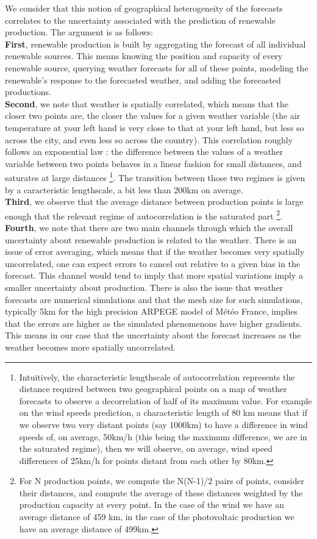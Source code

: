 We consider that this notion of geographical heterogeneity of the forecasts correlates to the uncertainty associated with the prediction of renewable production. The argument is as follows: \\
\textbf{First}, renewable production is built by aggregating the forecast of all individual renewable sources. This means knowing the position and capacity of every renewable source, querying weather forecasts for all of these points, modeling the renewable's response to the forecasted weather, and adding the forecasted productions. \\
\textbf{Second}, we note that weather is spatially correlated, which means that the closer two points are, the closer the values for a given weather variable (the air temperature at your left hand is very close to that at your left hand, but less so across the city, and even less so across the country). This correlation roughly follows an exponential law : the difference between the values of a weather variable between two points behaves in a linear fashion for small distances, and saturates at large distances \footnote{Intuitively, the characteristic lengthscale of autocorrelation represents the distance required between two geographical points on a map of weather forecasts to observe a decorrelation of half of its maximum value. For example on the wind speeds prediction, a characteristic length of 80 km means that if we observe two very distant points (say 1000km) to have a difference in wind speeds of, on average, 50km/h (this being the maximum difference, we are in the saturated regime), then we will observe, on average, wind speed differences of 25km/h for points distant from each other by 80km.}. The transition between those two regimes is given by a caracteristic lengthscale, a bit less than 200km on average. \\
\textbf{Third}, we observe that the average distance between production points is large enough that the relevant regime of autocorrelation is the saturated part \footnote{For N production points, we compute the N(N-1)/2 pairs of points, consider their distances, and compute the average of these distances weighted by the production capacity at every point. In the case of the wind we have an average distance of 459 km, in the case of the photovoltaic production we have an average distance of 499km.}. \\
\textbf{Fourth}, we note that there are two main channels through which the overall uncertainty about renewable production is related to the weather. There is an issue of error averaging, which means that if the weather becomes very spatially uncorrelated, one can expect errors to cancel out relative to a given bias in the forecast. This channel would tend to imply that more spatial variations imply a smaller uncertainty about production. There is also the issue that weather forecasts are numerical simulations and that the mesh size for such simulations, typically 5km for the high precision ARPEGE model of Météo France, implies that the errors are higher as the simulated phenomenons have higher gradients. This means in our case that the uncertainty about the forecast increases as the weather becomes more spatially uncorrelated. \\
